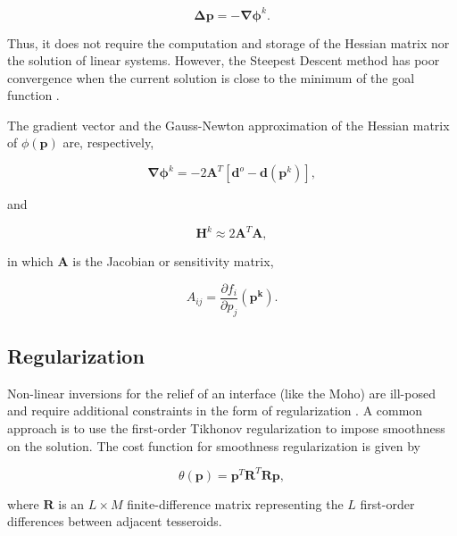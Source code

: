 \documentclass[extra]{gji}
\begin{document}
\begin{equation}
    \mathbf{\Delta p} = -\mathbf{\nabla\phi}^k.
    \label{eq:steepest}
\end{equation}

\noindent
Thus, it does not require the computation and storage of the Hessian matrix
nor the solution of linear systems.
However, the Steepest Descent method has poor convergence when the
current solution is close to the minimum of the goal function
\citep{kelley1987}.

The gradient vector and the Gauss-Newton approximation of the Hessian matrix
of $\phi(\mathbf{p})$ are, respectively,

\begin{equation}
    \mathbf{\nabla\phi}^k = -2\mathbf{A}^T[\mathbf{d}^o - \mathbf{d}(\mathbf{p}^k)],
    \label{eq:gradient}
\end{equation}

\noindent
and

\begin{equation}
    \mathbf{H}^k \approx 2\mathbf{A}^T\mathbf{A},
    \label{eq:hessian}
\end{equation}

\noindent in which
$\mathbf{A}$ is the Jacobian or sensitivity matrix,

\begin{equation}
    A_{ij} = \dfrac{\partial f_i}{\partial p_j}(\mathbf{p^k}).
    \label{eq:jacobian}
\end{equation}



\subsection{Regularization}

Non-linear inversions for the relief of an interface (like the Moho)
are ill-posed and require additional constraints in the form of
regularization \citep{silva2001}.
A common approach is to use the first-order Tikhonov regularization to impose
smoothness on the solution.
The cost function for smoothness regularization is given by

\begin{equation}
    \theta(\mathbf{p}) = \mathbf{p}^T\mathbf{R}^T\mathbf{R}\mathbf{p},
    \label{eq:regul}
\end{equation}

\noindent where $\mathbf{R}$ is an $L \times M$ finite-difference matrix
representing the $L$ first-order differences between adjacent tesseroids.
\end{document}
